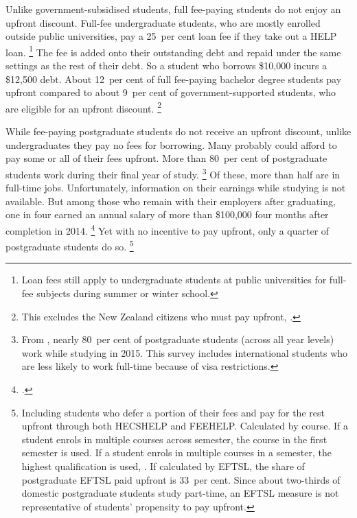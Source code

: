 \documentclass{grattan}
\begin{document}
Unlike government-subsidised students, full fee-paying students do not enjoy an upfront discount.
Full-fee undergraduate students, who are mostly enrolled outside public universities, pay a 25~per cent loan fee if they take out a \gls{HELP} loan.%
   \footnote{\Gls{Loan fees} still apply to undergraduate students at public universities for full-fee subjects during summer or winter school.} The fee is added onto their outstanding debt and repaid under the same settings as the rest of their debt.
So a student who borrows \$10,000 incurs a \$12,500 debt.
About 12~per cent of full fee-paying bachelor degree students pay upfront compared to about 9~per cent of government-supported students, who are eligible for an upfront discount.%
   \footnote{This excludes the New Zealand citizens who must pay upfront, \textcite{EducationvariousyearsHigherEducationStatistics}.}

While fee-paying postgraduate students do not receive an upfront discount, unlike undergraduates they pay no fees for borrowing.
Many probably could afford to pay some or all of their fees upfront.
More than 80~per cent of postgraduate students work during their final year of study.%
   \footnote{From \textcite{ABS2016MicrodataEducationwork}, nearly 80~per cent of postgraduate students (across all year levels) work while studying in 2015.
This survey includes international students who are less likely to work full-time because of visa restrictions.} 
Of these, more than half are in full-time jobs.
Unfortunately, information on their earnings while studying is not available.
But among those who remain with their employers after graduating, one in four earned an annual salary of more than \$100,000 four months after completion in 2014.%
\footcite{GCA2015AustralianGraduateSurvey} %
Yet with no incentive to pay upfront, only a quarter of postgraduate students do so.%
   \footnote{Including students who defer a portion of their fees and pay for the rest upfront through both \gls{HECSHELP} and \gls{FEEHELP}\@.
Calculated by course.
If a student enrols in multiple courses across semester, the course in the first semester is used.
If a student enrols in multiple courses in a semester, the highest qualification is used, \textcite{EducationvariousyearsHigherEducationStatistics}.
If calculated by \gls{EFTSL}, the share of postgraduate \gls{EFTSL} paid upfront is 33~per cent.
Since about two-thirds of domestic postgraduate students study part-time, an \gls{EFTSL} measure is not representative of students' propensity to pay upfront.}
\end{document}
